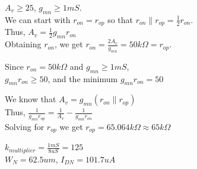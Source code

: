 \documentclass{article}
\begin{document}
\newpage 

\noindent $A_{v} \geq 25$, $g_{mn} \geq 1mS$.
\vspace{8pt}
\\
\noindent We can start with $r_{on} = r_{op}$ so that $r_{on} \| r_{op} = \frac{1}{2} r_{on}$.
\vspace{8pt}
\\ Thus, $A_{v} = \frac{1}{2} g_{mn} r_{on}$  
\vspace{8pt}
\\ Obtaining $r_{on}$, we get $r_{on} = \frac{2A_v}{g_{mn}} = 50k\Omega = r_{op}$. 

\vspace{20pt}
\noindent Since $r_{on} = 50k\Omega$ and $g_{mn} \geq 1mS$,
\vspace{8pt}
\\ $g_{mn}r_{on} \geq 50$, and the minimum $g_{mn}r_{on} = 50$

\vspace{20pt}
\noindent We know that $A_v = g_{mn}(r_{on}\|r_{op})$
\vspace{8pt}
\\ Thus, $\frac{1}{g_{mn}r_{op}} = \frac{1}{A_v} - \frac{1}{g_{mn}r_{on}}$
\vspace{4pt}
\\ Solving for $r_{op}$ we get $r_{op} = 65.064k\Omega \approx 65k\Omega$

\vspace{20pt}
\Large
\noindent $k_{multiplier} = \frac{1mS}{8uS} = 125$
\normalsize 
\vspace{8pt}
\\ $W_N = 62.5um$, $I_{DN} = 101.7uA$
\end{document}
